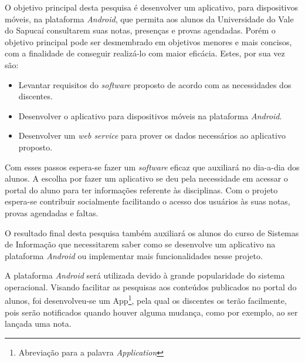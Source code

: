 	
	\par O objetivo principal desta pesquisa é desenvolver um aplicativo,
para dispositivos móveis, na plataforma \textit{Android}, que permita aos
alunos da Universidade do Vale do Sapucaí consultarem suas notas, presenças e
provas agendadas. Porém o objetivo principal pode ser desmembrado em objetivos
menores e mais concisos, com a finalidade de conseguir realizá-lo com maior
eficácia. Estes, por sua vez são:
	
	\begin{itemize}
	  
	  \item Levantar requisitos do \textit{software} proposto de acordo com as
	  necessidades dos discentes.
	  
	  \item Desenvolver o aplicativo para dispositivos móveis na plataforma
	  \textit{Android}.
	  
	  \item Desenvolver um \textit{web service} para prover os dados necessários ao
	  aplicativo proposto.
	
	\end{itemize}
	
	\par Com esses passos espera-se fazer um \textit{software} eficaz que auxiliará
no dia-a-dia dos alunos. A escolha por fazer um aplicativo se deu pela
necessidade em acessar o portal do aluno para ter informações referente às
disciplinas. Com o projeto espera-se contribuir socialmente facilitando o
acesso dos usuários às suas notas, provas agendadas e faltas.

	\par O resultado final desta pesquisa também auxiliará os alunos do curso de
Sistemas de Informação que necessitarem saber como se desenvolve um aplicativo
na plataforma \textit{Android} ou implementar mais funcionalidades nesse
projeto.

	\par A plataforma \textit{Android} será utilizada devido à grande popularidade
do sistema operacional. Visando facilitar as pesquisas aos conteúdos publicados
no portal do alunos, foi desenvolveu-se um App\footnote{Abreviação para a
palavra \textit{Application}}, pela qual os discentes os terão facilmente, pois
serão notificados quando houver alguma mudança, como por exemplo, ao ser lançada
uma nota.
